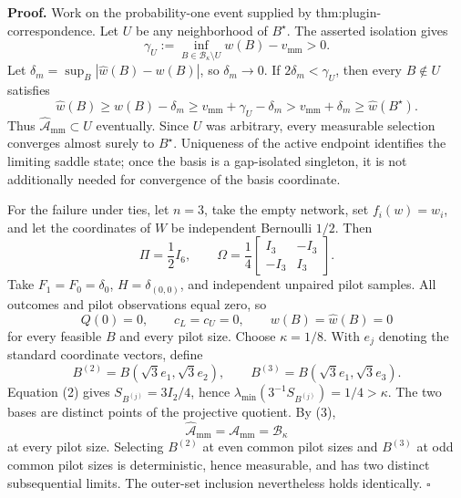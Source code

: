 \textbf{Proof.}
Work on the probability-one event supplied by thm:plugin-correspondence. Let \(U\) be any neighborhood of \(B^\star\). The asserted isolation gives
\[
\gamma_U:=\inf_{B\in\mathcal B_\kappa\setminus U}w(B)-v_{\mathrm{mm}}>0. \tag{1}
\]
Let \(\delta_m=\sup_B|\widehat w(B)-w(B)|\), so \(\delta_m\to0\). If \(2\delta_m<\gamma_U\), then every \(B\notin U\) satisfies
\[
\widehat w(B)\ge w(B)-\delta_m
\ge v_{\mathrm{mm}}+\gamma_U-\delta_m
>v_{\mathrm{mm}}+\delta_m
\ge\widehat w(B^\star).
\]
Thus \(\widehat{\mathcal A}_{\mathrm{mm}}\subset U\) eventually. Since \(U\) was arbitrary, every measurable selection converges almost surely to \(B^\star\). Uniqueness of the active endpoint identifies the limiting saddle state; once the basis is a gap-isolated singleton, it is not additionally needed for convergence of the basis coordinate.

For the failure under ties, let \(n=3\), take the empty network, set \(f_i(w)=w_i\), and let the coordinates of \(W\) be independent Bernoulli \(1/2\). Then
\[
\Pi=\frac12I_6,
\qquad
\Omega=\frac14\begin{bmatrix}I_3&-I_3\\-I_3&I_3\end{bmatrix}. \tag{2}
\]
Take \(F_1=F_0=\delta_0\), \(H=\delta_{(0,0)}\), and independent unpaired pilot samples. All outcomes and pilot observations equal zero, so
\[
Q(0)=0,
\qquad c_L=c_U=0,
\qquad w(B)=\widehat w(B)=0 \tag{3}
\]
for every feasible \(B\) and every pilot size. Choose \(\kappa=1/8\). With \(e_j\) denoting the standard coordinate vectors, define
\[
B^{(2)}=B(\sqrt3e_1,\sqrt3e_2),
\qquad
B^{(3)}=B(\sqrt3e_1,\sqrt3e_3).
\]
Equation (2) gives \(S_{B^{(j)}}=3I_2/4\), hence \(\lambda_{\min}(3^{-1}S_{B^{(j)}})=1/4>\kappa\). The two bases are distinct points of the projective quotient. By (3),
\[
\widehat{\mathcal A}_{\mathrm{mm}}=\mathcal A_{\mathrm{mm}}=\mathcal B_\kappa
\]
at every pilot size. Selecting \(B^{(2)}\) at even common pilot sizes and \(B^{(3)}\) at odd common pilot sizes is deterministic, hence measurable, and has two distinct subsequential limits. The outer-set inclusion nevertheless holds identically. \(\square\)